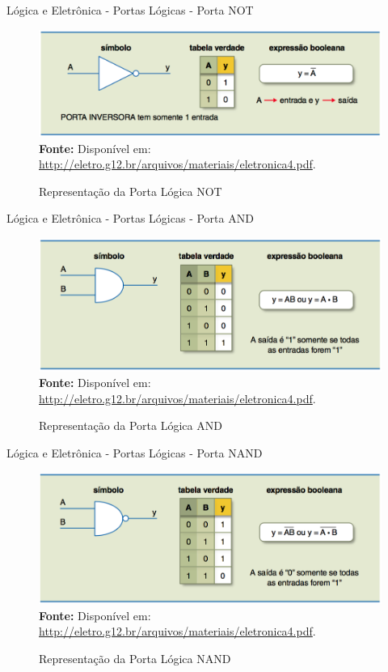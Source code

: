 	\begin{frame}{Lógica e Eletrônica - Portas Lógicas - Porta NOT}
		\begin{figure}[h]
			\centering
			\caption{Representação da Porta Lógica NOT}
			\includegraphics[height=0.55\textheight]{img/ed/ed-porta_not.png}
			\\
			{\footnotesize \textbf{Fonte:} Disponível em: \url{http://eletro.g12.br/arquivos/materiais/eletronica4.pdf}.}
			\label{fig:ed-porta_NOT}
		\end{figure}
	\end{frame}

	\begin{frame}{Lógica e Eletrônica - Portas Lógicas - Porta AND}
		\begin{figure}[h]
			\centering
			\caption{Representação da Porta Lógica AND}
			\includegraphics[height=0.66\textheight]{img/ed/ed-porta_and.png}
			\\
			{\footnotesize \textbf{Fonte:} Disponível em: \url{http://eletro.g12.br/arquivos/materiais/eletronica4.pdf}.}
			\label{fig:ed-porta_AND}
		\end{figure}
	\end{frame}

	\begin{frame}{Lógica e Eletrônica - Portas Lógicas - Porta NAND}
		\begin{figure}[h]
			\centering
			\caption{Representação da Porta Lógica NAND}
			\includegraphics[height=0.66\textheight]{img/ed/ed-porta_nand.png}
			\\
			{\footnotesize \textbf{Fonte:} Disponível em: \url{http://eletro.g12.br/arquivos/materiais/eletronica4.pdf}.}
			\label{fig:ed-porta_NAND}
		\end{figure}
	\end{frame}

